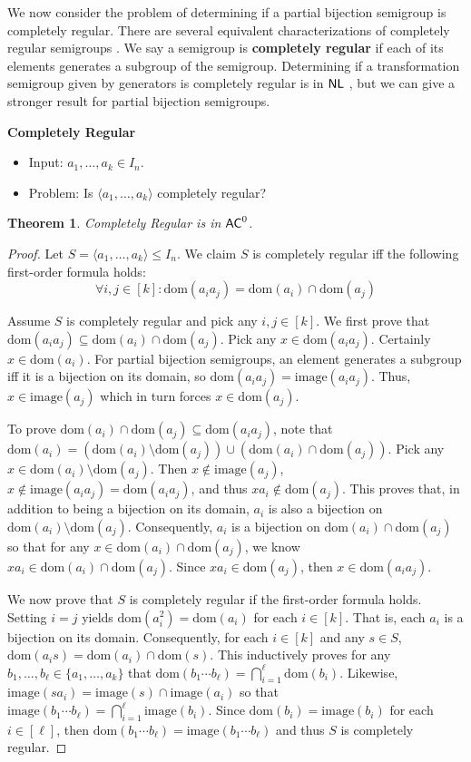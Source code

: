 \documentclass{amsart}
\newcommand{\dom}{\mathrm{dom}}
\newcommand{\image}{\mathrm{image}}
\newcommand{\NL}{\ensuremath\mathsf{NL}}
\newcommand{\AC}{\ensuremath\mathsf{AC}}
\newtheorem{theorem}{Theorem}[section]
\theoremstyle{remark}
\numberwithin{equation}{section}
\begin{document}
We now consider the problem of determining if a partial bijection semigroup is completely regular. There are several equivalent characterizations of completely regular semigroups \cite[Prop 4.1.1]{HO:FST}. We say a semigroup is {\bf completely regular} if each of its elements generates a subgroup of the semigroup. Determining if a transformation semigroup given by generators is completely regular is in $\NL$ \cite[Thm 5.6]{FJ:CP}, but we can give a stronger result for partial bijection semigroups.

\medskip
{\bf Completely Regular}
\begin{itemize}
\item Input: $a_1,\dots,a_k \in I_n$.
\item Problem: Is $\langle a_1,\dots,a_k\rangle$ completely regular?
\end{itemize}

\begin{theorem}
Completely Regular is in $\AC^0$.
\end{theorem}
\begin{proof}
Let $S = \langle a_1,\dots,a_k \rangle \leq I_n$. We claim $S$ is completely regular iff the following first-order formula holds:
\[ \forall i,j \in [k] : \dom(a_ia_j) = \dom(a_i) \cap \dom(a_j) \]

Assume $S$ is completely regular and pick any $i,j \in [k]$. We first prove that $\dom(a_ia_j) \subseteq \dom(a_i) \cap \dom(a_j)$. Pick any $x \in \dom(a_ia_j)$. Certainly $x \in \dom(a_i)$. For partial bijection semigroups, an element generates a subgroup iff it is a bijection on its domain, so $\dom(a_ia_j) = \image(a_ia_j)$. Thus, $x \in \image(a_j)$ which in turn forces $x \in \dom(a_j)$.

To prove $\dom(a_i) \cap \dom(a_j) \subseteq \dom(a_ia_j)$, note that $\dom(a_i) = (\dom(a_i) \setminus \dom(a_j)) \cup (\dom(a_i) \cap \dom(a_j))$. Pick any $x \in \dom(a_i) \setminus \dom(a_j)$. Then $x \not \in \image(a_j)$, $x \not \in \image(a_ia_j) = \dom(a_ia_j)$, and thus $xa_i \not \in \dom(a_j)$. This proves that, in addition to being a bijection on its domain, $a_i$ is also a bijection on $\dom(a_i) \setminus \dom(a_j)$. Consequently, $a_i$ is a bijection on $\dom(a_i) \cap \dom(a_j)$ so that for any $x \in \dom(a_i) \cap \dom(a_j)$, we know $xa_i \in \dom(a_i) \cap \dom(a_j)$. Since $xa_i \in \dom(a_j)$, then $x \in \dom(a_ia_j)$.

We now prove that $S$ is completely regular if the first-order formula holds. Setting $i=j$ yields $\dom(a_i^2) = \dom(a_i)$ for each $i \in [k]$. That is, each $a_i$ is a bijection on its domain. Consequently, for each $i\in [k]$ and any $s \in S$, $\dom(a_is) = \dom(a_i) \cap \dom(s)$. This inductively proves for any $b_1,\dots,b_\ell \in \{a_1,\dots,a_k\}$ that $\dom(b_1 \cdots b_\ell) = \bigcap_{i=1}^\ell \dom(b_i)$. Likewise, $\image(sa_i) = \image(s) \cap \image(a_i)$ so that $\image(b_1 \cdots b_\ell) = \bigcap_{i=1}^\ell \image(b_i)$. Since $\dom(b_i) = \image(b_i)$ for each $i \in [\ell]$, then $\dom(b_1 \cdots b_\ell) = \image(b_1 \cdots b_\ell)$ and thus $S$ is completely regular.
\end{proof}
\end{document}
